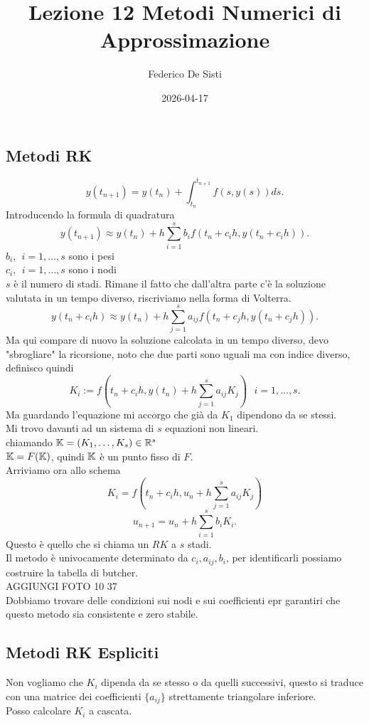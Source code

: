 \documentclass[12px]{article}
\title{Lezione 12 Metodi Numerici di Approssimazione}
\date{2026-04-17}
\author{Federico De Sisti}
\begin{document}
	\maketitle
	\newpage
	\subsection{Metodi RK}
	\[
		y(t_{n+1}) = y(t_n) + \int_{t_n}^{t_{n+1}}f(s,y(s))ds
	.\] 
	Introducendo la formula di quadratura
	\[
		y(t_{n+1})\approx y(t_n) + h \sum^{s}_{i=1}b_if(t_n + c_ih,y(t_n + c_i h))
	.\] 
	$b_i, \ \ i = 1,\ldots,s $ sono i pesi\\
	 $c_i, \ \ i = 1,\ldots, s$ sono i nodi\\
	  $s$ è il numero di stadi.
	  Rimane il fatto che dall'altra parte c'è la soluzione valutata in un tempo diverso, riscriviamo nella forma di Volterra.
	  \[
		  y(t_n + c_ih) \approx y(t_n) + h \sum^{s}_{j=1} a_{ij}f(t_n + c_jh,y(t_n + c_j h))
	  .\] 
	  Ma qui compare di nuovo la soluzione calcolata in un tempo diverso, devo "sbrogliare" la ricorsione, noto che due parti sono uguali ma con indice diverso, definisco quindi
	  \[
		  K_i := f(t_n + c_ih, y(t_n) + h \sum_{j=1}^{s}a_{ij}K_j)\ \ \ i = 1,\ldots, s
	  .\] 
	  Ma guardando l'equazione mi accorgo che già da $K_1$ dipendono da se stessi.\\
	  Mi trovo davanti ad un sistema di $s$ equazioni non lineari.\\
	  chiamando $\mathbb{K} = (K_1,\ldots, K_s)\in\mathbb{R}^s$\\
	  $\mathbb{K} = F(\mathbb{K})$, quindi  $\mathbb{K}$ è un punto fisso di $F$.\\
	  Arriviamo ora allo schema
	   \[
		   K_i = f(t_n + c_i h, u_n + h \sum^{s}_{j=1}a_{ij}K_j)
	  \] 
	  \[
		  u_{n+1} = u_n + h \sum^{s}_{i=1}b_iK_i
	  .\] 
	  Questo è quello che si chiama un $RK$ a $s$ stadi.\\
	  Il metodo è univocamente determinato da $c_i, a_{ij}, b_i$, per identificarli possiamo costruire la tabella di butcher. \\
	  AGGIUNGI FOTO 10 37\\
	  Dobbiamo trovare delle condizioni sui nodi e sui coefficienti epr garantiri che questo metodo sia consistente e zero stabile.\\
	  \subsection{Metodi RK Espliciti}
	  Non vogliamo che $K_i$ dipenda da se stesso o da quelli successivi, questo si traduce con una matrice dei coefficienti  $\{a_{ij}\}$ strettamente triangolare inferiore.\\
	  Posso calcolare  $K_i$ a cascata.\\
\end{document}
